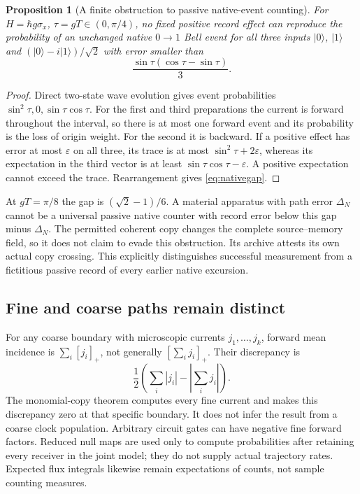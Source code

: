 \documentclass[11pt]{article}
\newtheorem{proposition}[theorem]{Proposition}
\theoremstyle{definition}\newtheorem{definition}[theorem]{Definition}
\theoremstyle{remark}\newtheorem{remark}[theorem]{Remark}
\begin{document}
\begin{proposition}[A finite obstruction to passive native-event counting]
For $H=\hbar g\sigma_x$, $\tau=gT\in(0,\pi/4)$, no fixed positive record effect can reproduce the probability of an unchanged native $0\to1$ Bell event for all three inputs $|0\rangle$, $|1\rangle$ and $(|0\rangle-i|1\rangle)/\sqrt2$ with error smaller than
\begin{equation}
 \frac{\sin\tau(\cos\tau-\sin\tau)}{3}.
 \label{eq:nativegap}
\end{equation}
\end{proposition}
\begin{proof}
Direct two-state wave evolution gives event probabilities $\sin^2\tau,0,\sin\tau\cos\tau$. For the first and third preparations the current is forward throughout the interval, so there is at most one forward event and its probability is the loss of origin weight. For the second it is backward. If a positive effect has error at most $\varepsilon$ on all three, its trace is at most $\sin^2\tau+2\varepsilon$, whereas its expectation in the third vector is at least $\sin\tau\cos\tau-\varepsilon$. A positive expectation cannot exceed the trace. Rearrangement gives \eqref{eq:nativegap}.
\end{proof}
At $gT=\pi/8$ the gap is $(\sqrt2-1)/6$. A material apparatus with path error $\Delta_N$ cannot be a universal passive native counter with record error below this gap minus $\Delta_N$. The permitted coherent copy changes the complete source--memory field, so it does not claim to evade this obstruction. Its archive attests its own actual copy crossing. This explicitly distinguishes successful measurement from a fictitious passive record of every earlier native excursion.

\subsection{Fine and coarse paths remain distinct}
For any coarse boundary with microscopic currents $j_1,\ldots,j_k$, forward mean incidence is $\sum_i[j_i]_+$, not generally $[\sum_i j_i]_+$. Their discrepancy is
\[
 \frac12\left(\sum_i|j_i|-\left|\sum_i j_i\right|\right).
\]
The monomial-copy theorem computes every fine current and makes this discrepancy zero at that specific boundary. It does not infer the result from a coarse clock population. Arbitrary circuit gates can have negative fine forward factors. Reduced null maps are used only to compute probabilities after retaining every receiver in the joint model; they do not supply actual trajectory rates. Expected flux integrals likewise remain expectations of counts, not sample counting measures.
\end{document}
